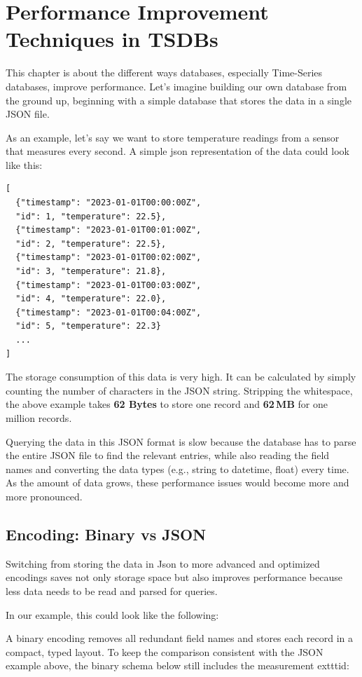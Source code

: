 \chapter{Performance Improvement Techniques in TSDBs}\label{sec:performance-improvement}

This chapter is about the different ways databases, especially Time-Series
databases, improve performance. Let's imagine building our own database from
the ground up, beginning with a simple database that stores the data in a
single JSON file.

As an example, let's say we want to store temperature readings from a sensor
that measures every second. A simple json representation of the data could look
like this:
\begin{verbatim}
[
  {"timestamp": "2023-01-01T00:00:00Z",
  "id": 1, "temperature": 22.5},
  {"timestamp": "2023-01-01T00:01:00Z",
  "id": 2, "temperature": 22.5},
  {"timestamp": "2023-01-01T00:02:00Z",
  "id": 3, "temperature": 21.8},
  {"timestamp": "2023-01-01T00:03:00Z",
  "id": 4, "temperature": 22.0},
  {"timestamp": "2023-01-01T00:04:00Z",
  "id": 5, "temperature": 22.3}
  ...
]
\end{verbatim}

The storage consumption of this data is very high. It can be calculated by
simply counting the number of characters in the JSON string. Stripping the
whitespace, the above example takes \textbf{62 Bytes} to store one record and
\textbf{62\,MB} for one million records.

Querying the data in this JSON format is slow because the database has to parse
the entire JSON file to find the relevant entries, while also reading the field
names and converting the data types (e.g., string to datetime, float) every
time. As the amount of data grows, these performance issues would become more
and more pronounced.

\section{Encoding: Binary vs JSON}

Switching from storing the data in Json to more advanced and optimized
encodings saves not only storage space but also improves performance because
less data needs to be read and parsed for queries.

In our example, this could look like the following:

A binary encoding removes all redundant field names and stores each record in a
compact, typed layout. To keep the comparison consistent with the JSON example
above, the binary schema below still includes the measurement exttt{id}:

